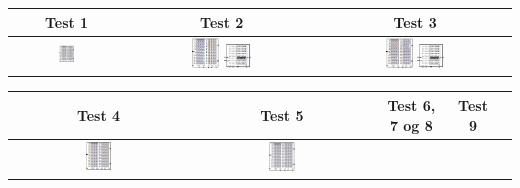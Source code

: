 \documentclass[12pt, a4paper]{article}
\begin{document}
\begin{center}
\begin{tabular}{| c | c | c | }
    \hline
    	Test 1 & Test 2 & Test 3 \\ \hline
	\includegraphics[width=0.15\textwidth]{1.png} &
	\includegraphics[width=0.15\textwidth]{r2.png}
	\includegraphics[width=0.15\textwidth]{2.png} & 
	\includegraphics[width=0.15\textwidth]{3.png}
	\includegraphics[width=0.15\textwidth]{2.png} \\
    \hline
\end{tabular}
\begin{tabular}{| c | c | c | c | c | }
    \hline
    	Test 4 & Test 5 & Test 6, 7 og 8 & Test 9 \\ \hline
	\includegraphics[width=0.15\textwidth]{4.png} &
	\includegraphics[width=0.15\textwidth]{5.png} &

\end{tabular}
\end{center}
\end{document}
